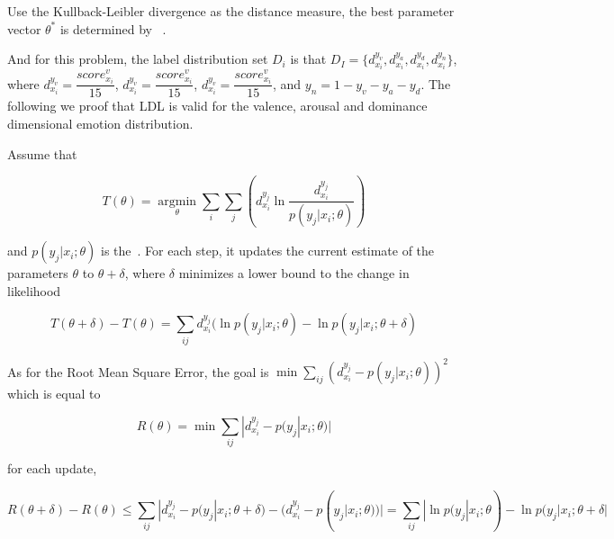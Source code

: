 Use the Kullback-Leibler divergence	as 
the distance measure,
the best parameter vector $ \theta^{\ast} $ is determined by
~.

And for this problem,
the label distribution set $ D_{i} $ is that
$ D_{I} = \{d^{y_{v}}_{x_{i}},  d^{y_{a}}_{x_{i}}, d^{y_{d}}_{x_{i}}, d^{y_{n}}_{x_{i}}\} $,
where
$ d^{y_{v}}_{x_{i}} = \dfrac{score^{v}_{x_{i}}}{15} $,
$ d^{y_{v}}_{x_{i}} = \dfrac{score^{v}_{x_{i}}}{15} $,
$ d^{y_{v}}_{x_{i}} = \dfrac{score^{v}_{x_{i}}}{15} $,
and $ y_{n} = 1 - y_{v}  - y_{a} - y_{d} $.
The following we proof that 
LDL is valid for the valence, arousal  
and dominance dimensional emotion distribution.

Assume that 

\begin{equation}
T(\theta) =
\mathop{\arg\min}\limits_{\theta}
\sum\limits_{i}
\sum\limits_{j}
(d^{y_{j}}_{ x_{ i } }
\ln \dfrac{ d^{y_{j}}_{ x_{ i } } }{ p( y_{ j } | x_{ i } ;{\theta}) })
\end{equation}

and $ p( y_{ j } | x_{ i } ;{\theta}) $ is the~. 
For each step, 
it updates the current estimate of the parameters 
\textbf{$\theta$} to \textbf{ $\theta + \delta$},
where \textbf{$ \delta $} minimizes a lower bound to the change in likelihood

\begin{equation}\label{eq:update}
T(\theta + \delta) - T(\theta) =
\sum\limits_{ij} d^{y_{j}}_{ x_{ i } } ( \ln p(y_{j}|x_{i};{\theta}) - \ln p(y_{j}|x_{i};{\theta +\delta})
\end{equation}

As for the Root Mean Square Error,
the goal is 
$ \mathop{\min}\sum\limits_{ij} ( d^{y_{j}}_{ x_{ i } } -  p(y_{j}|x_{i};{\theta}))^{2}$
which is equal to

\begin{equation}\label{eq:rmse}
	R(\theta) = \mathop{\min} \sum\limits_{ij}
	|d^{y_{j}}_{ x_{ i } } -  p(y_{j}|x_{i};{\theta})|
\end{equation}

for each update,

\begin{equation}\label{eq:rmse'}
	R(\theta + \delta) - R(\theta) \leq 
	\sum\limits_{ij} |
	d^{y_{j}}_{ x_{ i } }  - 
	p(y_{j}|x_{i};{\theta + \delta}) - 
	(d^{y_{j}}_{ x_{ i } }  - 
	p(y_{j}|x_{i};{\theta})) | =
	\sum\limits_{ij}
	|  \ln p(y_{j}|x_{i};{\theta}) - \ln p(y_{j}|x_{i};{\theta +\delta} |
\end{equation}

